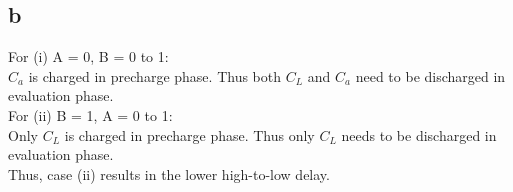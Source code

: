 \documentclass[a4paper,10pt]{article}
\begin{document}
\subsection*{b}
For (i) A = 0, B = 0 to 1:\\
\begin{math}C_a\end{math} is charged in precharge phase. Thus both \begin{math}C_L\end{math} and \begin{math}C_a\end{math}
 need to be discharged in evaluation phase.\\
For (ii) B = 1, A = 0 to 1:\\
Only \begin{math}C_L\end{math} is charged in precharge phase. Thus only \begin{math}C_L\end{math} needs to be discharged in 
evaluation phase.\\
Thus, case (ii) results in the lower high-to-low delay.
\end{document}
